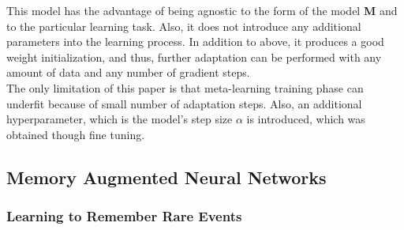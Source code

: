 This model has the advantage of being agnostic to the form of the model \textbf{M} and to the particular learning task. Also, it does not introduce any additional parameters into the learning process. In addition to above, it produces a good weight initialization, and thus, further adaptation can be performed with any amount of data and any number of gradient steps.\\

The only limitation of this paper is that meta-learning training phase can underfit because of small number of adaptation steps. Also, an additional hyperparameter, which is the model's step size $\alpha$ is introduced, which was obtained though fine tuning.

\subsection{Memory Augmented Neural Networks}

\subsubsection{Learning to Remember Rare Events}







